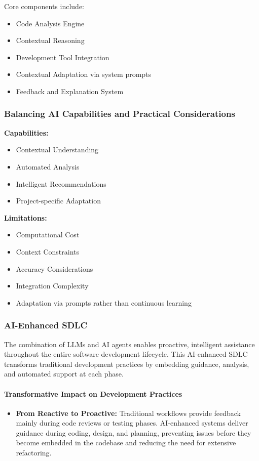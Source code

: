 \begin{spacing}{1.2}
Core components include:

\begin{itemize}
    \item Code Analysis Engine
    \item Contextual Reasoning
    \item Development Tool Integration
    \item Contextual Adaptation via system prompts
    \item Feedback and Explanation System
\end{itemize}

\subsubsection*{Balancing AI Capabilities and Practical Considerations}
\textbf{Capabilities:}
\begin{itemize}
    \item Contextual Understanding
    \item Automated Analysis
    \item Intelligent Recommendations
    \item Project-specific Adaptation
\end{itemize}

\textbf{Limitations:}
\begin{itemize}
    \item Computational Cost
    \item Context Constraints
    \item Accuracy Considerations
    \item Integration Complexity
    \item Adaptation via prompts rather than continuous learning
\end{itemize}

\subsubsection*{AI-Enhanced SDLC}
The combination of LLMs and AI agents enables proactive, intelligent assistance throughout the entire software development lifecycle. This AI-enhanced SDLC transforms traditional development practices by embedding guidance, analysis, and automated support at each phase.

\paragraph{Transformative Impact on Development Practices}
\begin{itemize}
    \item \textbf{From Reactive to Proactive:} Traditional workflows provide feedback mainly during code reviews or testing phases. AI-enhanced systems deliver guidance during coding, design, and planning, preventing issues before they become embedded in the codebase and reducing the need for extensive refactoring.
    

\end{itemize}
\end{spacing}
